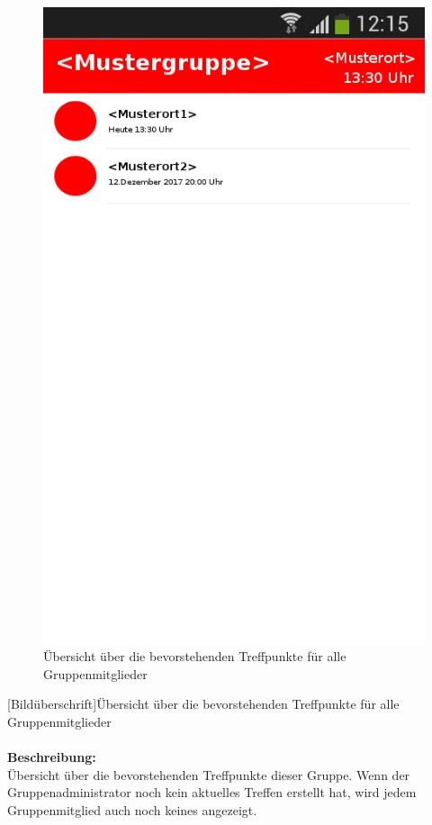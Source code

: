 \begin{figure}[H]
	\caption{Übersicht über die bevorstehenden Treffpunkte für alle Gruppenmitglieder}
	\includegraphics[scale =0.5]{resources/images/treffpunktuebersicht.png}
\end{figure}
[Bildüberschrift]Übersicht über die bevorstehenden Treffpunkte für alle Gruppenmitglieder\\ \\
\textbf{Beschreibung:}\\
Übersicht über die bevorstehenden Treffpunkte dieser Gruppe. Wenn der Gruppenadministrator noch kein aktuelles Treffen erstellt hat, wird jedem Gruppenmitglied auch noch keines angezeigt.\\
